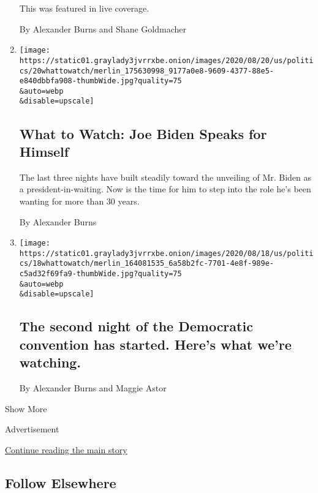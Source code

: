 \begin{enumerate}
  This was featured in live coverage.

  By Alexander Burns and Shane Goldmacher
\item
  \href{/2020/08/20/us/politics/democratic-national-convention-guide.html}{}

  \texttt{[image: https://static01.graylady3jvrrxbe.onion/images/2020/08/20/us/politics/20whattowatch/merlin\_175630998\_9177a0e8-9609-4377-88e5-e840dbbfa908-thumbWide.jpg?quality=75\\\&auto=webp\\\&disable=upscale]}

  \hypertarget{what-to-watch-joe-biden-speaks-for-himself-2}{%
  \subsection{What to Watch: Joe Biden Speaks for
  Himself}\label{what-to-watch-joe-biden-speaks-for-himself-2}}

  The last three nights have built steadily toward the unveiling of Mr.
  Biden as a president-in-waiting. Now is the time for him to step into
  the role he's been wanting for more than 30 years.

  By Alexander Burns
\item
  \href{/2020/08/18/us/elections/the-second-night-of-the-democratic-convention-has-started-heres-what-were-watching.html}{}

  \texttt{[image: https://static01.graylady3jvrrxbe.onion/images/2020/08/18/us/politics/18whattowatch/merlin\_164081535\_6a58b2fc-7701-4e8f-989e-c5ad32f69fa9-thumbWide.jpg?quality=75\\\&auto=webp\\\&disable=upscale]}

  \hypertarget{the-second-night-of-the-democratic-convention-has-started-heres-what-were-watching}{%
  \subsection{The second night of the Democratic convention has started.
  Here's what we're
  watching.}\label{the-second-night-of-the-democratic-convention-has-started-heres-what-were-watching}}

  By Alexander Burns and Maggie Astor
\end{enumerate}

Show More

Advertisement

\protect\hyperlink{after-mid2}{Continue reading the main story}

\hypertarget{follow-elsewhere}{%
\subsection{Follow Elsewhere}\label{follow-elsewhere}}

